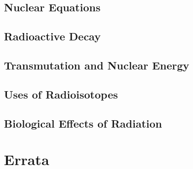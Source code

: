 \documentclass[12pt, openany, letterpaper]{memoir}
\begin{document}
\section{Nuclear Equations}

\section{Radioactive Decay}

\section{Transmutation and Nuclear Energy}

\section{Uses of Radioisotopes}

\section{Biological Effects of Radiation}

\backmatter
\chapter{Errata}
\end{document}
